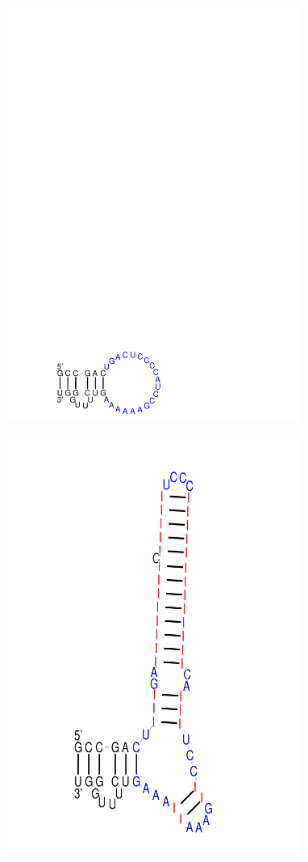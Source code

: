 \begin{figure}[H]
\begin{subfigure}{0.3\textwidth}
    \includegraphics[clip, trim=0 0 0 15cm, width=0.85\textwidth]{../img/alg-insert/3/multibranch-del}
  \end{subfigure}
  \begin{subfigure}{0.3\textwidth}
    \includegraphics[clip, trim=0 0 0 2cm, width=0.85\textwidth]{../img/alg-insert/3/multibranch-del-ins}

\end{subfigure}
\end{figure}
